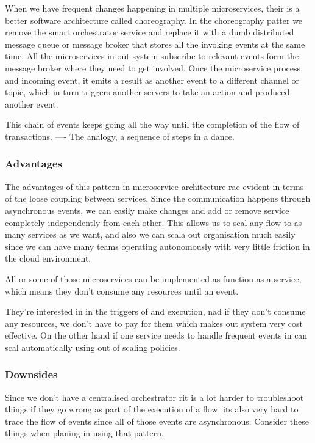 \documentclass[a4paper, 11pt]{book}
\begin{document}
    When we have frequent changes happening in multiple microservices, their is a better software architecture called choreography.
    In the choreography patter we remove the smart orchestrator service and replace it with a dumb distributed message queue or message broker that stores all the invoking events at the same time.
    All the microservices in out system subscribe to relevant events form the message broker where they need to get involved.
    Once the microservice process and incoming event, it emits a result as another event to a different channel or topic, which in turn triggers another servers to take an action and produced another event.

    This chain of events keeps going all the way until the completion of the flow of transactions.
    ---- The analogy, a sequence of steps in a dance.

    \subsubsection{Advantages}
    The advantages of this pattern in microservice architecture rae evident in terms of the loose coupling between services.
    Since the communication happens through asynchronous events, we can easily make changes and add or remove service completely independently from each other.
    This allows us to scal any flow to as many services as we want, and also we can scala out organisation much easily since we can have many teams operating autonomously with very little friction in the cloud environment.

    All or some of those microservices can be implemented as function as a service, which means they don't consume any resources until an event.

    They're interested in in the triggers of and execution, nad if they don't consume any resources, we don't have to pay for them which makes out system very cost effective.
    On the other hand if one service needs to handle frequent events in can scal automatically using out of scaling policies.

    \subsubsection{Downsides}
    Since we don't have a centralised orchestrator rit is a lot harder to troubleshoot things if they go wrong as part of the execution of a flow.
    its also very hard to trace the flow of events since all of those events are asynchronous.
    Consider these things when planing in using that pattern.
\end{document}
